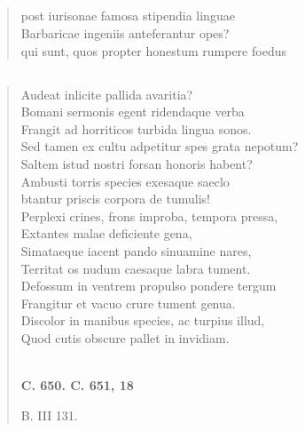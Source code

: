 \documentclass[11pt, a4paper]{report}
\begin{document}
            \subsection*{}
      \begin{verse}
      post iurisonae famosa stipendia linguae \\ Barbaricae ingeniis anteferantur opes? \\ qui sunt, quos propter honestum rumpere foedus \\ 
      \end{verse}
  
            \subsection*{}
      \begin{verse}
      Audeat inlicite pallida avaritia? \\ Bomani sermonis egent ridendaque verba \\ Frangit ad horriticos turbida lingua sonos. \\ Sed tamen ex cultu adpetitur spes grata nepotum? \\ Saltem istud nostri forsan honoris habent? \\ Ambusti torris species exesaque saeclo \\ btantur priscis corpora de tumulis! \\ Perplexi crines, frons improba, tempora pressa, \\ Extantes malae deficiente gena, \\ Simataeque iacent pando sinuamine nares, \\ Territat os nudum caesaque labra tument. \\ Defossum in ventrem propulso pondere tergum \\ Frangitur et vacuo crure tument genua. \\ Discolor in manibus species, ac turpius illud, \\ Quod cutis obscure pallet in invidiam. \\ 
        ﻿\pagebreak 
     \marginpar{[119]} \begin{center} \textbf{C. 650. C. 651, 18} \end{center}B. III 131. \\ 
      \end{verse}
  
\end{document}
